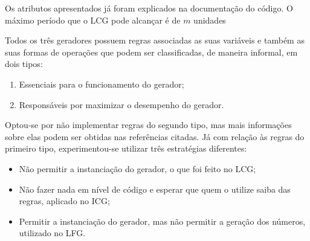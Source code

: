 \documentclass[12pt]{article}
\begin{document}
Os atributos apresentados já foram explicados na documentação do código. O
máximo período que o LCG pode alcançar é de $m$ unidades

Todos os três geradores possuem regras associadas as suas variáveis e também as
suas formas de operações que podem ser classificadas, de maneira informal, em
dois tipos:
\begin{enumerate}
  \item Essenciais para o funcionamento do gerador;
  \item Responsáveis por maximizar o desempenho do gerador.
\end{enumerate}

Optou-se por não implementar regras do segundo tipo, mas mais informações sobre
elas podem ser obtidas nas referências citadas. Já com relação às regras do
primeiro tipo, experimentou-se utilizar três estratégias diferentes:
\begin{itemize}
  \item Não permitir a instanciação do gerador, o que foi feito no LCG;
  \item Não fazer nada em nível de código e esperar que quem o utilize saiba das
  regras, aplicado no ICG;
  \item Permitir a instanciação do gerador, mas não permitir a geração dos
  números, utilizado no LFG.
\end{itemize}
\end{document}
